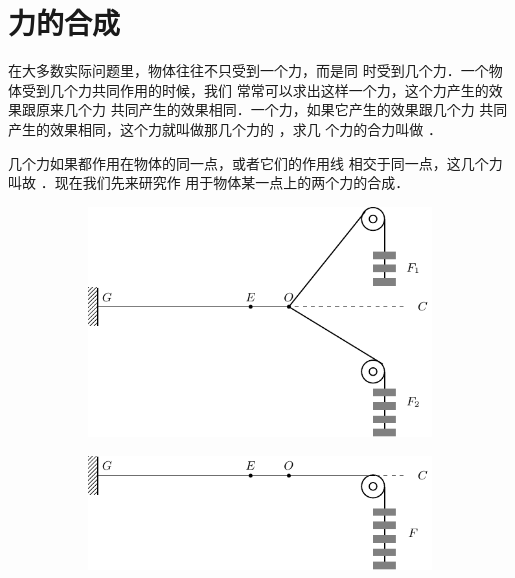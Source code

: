 \section{力的合成} 

    在大多数实际问题里，物体往往不只受到一个力，而是同
时受到几个力．一个物体受到几个力共同作用的时候，我们
常常可以求出这样一个力，这个力产生的效果跟原来几个力
共同产生的效果相同．一个力，如果它产生的效果跟几个力
共同产生的效果相同，这个力就叫做那几个力的 ，求几
个力的合力叫做 ． 

    几个力如果都作用在物体的同一点，或者它们的作用线
相交于同一点，这几个力叫故 ．现在我们先来研究作
用于物体某一点上的两个力的合成．

\begin{figure}[htbp]
    \centering
    \begin{subfigure} {1\linewidth} 
        \centering
        \includegraphics{fig/A/1-22a.pdf} 
        \caption{} \label{fig_A_1-22a} 
    \end{subfigure} 
    \begin{subfigure} {1\linewidth} 
        \centering
        \includegraphics{fig/A/1-22b.pdf} 
        \caption{} \label{fig_A_1-22b} 
    \end{subfigure} 

\end{figure}
